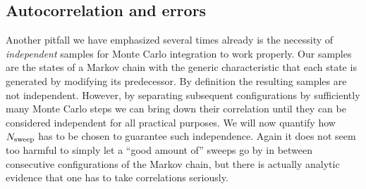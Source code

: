 \subsection{Autocorrelation and errors}

Another pitfall we have emphasized several times already is the necessity of
\emph{independent} samples for Monte Carlo integration to work properly. Our
samples are the states of a Markov chain with the generic characteristic that
each state is generated by modifying its predecessor. By definition the
resulting samples are not independent. However, by separating subsequent
configurations by sufficiently many Monte Carlo steps we can bring down their
correlation until they can be considered independent for all practical purposes.
We will now quantify how~$N_{\mathrm{sweep}}$ has to be chosen to guarantee such
independence. Again it does not seem too harmful to simply let a ``good amount
of'' sweeps go by in between consecutive configurations of the Markov chain, but
there is actually analytic evidence that one has to take correlations seriously.

